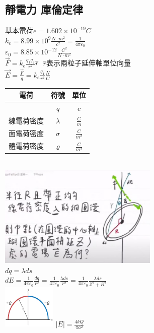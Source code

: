 \documentclass[a4paper,10pt,twocolumn,oneside]{article}
\begin{document}
\begin{normalsize}
\subsection{靜電力 庫倫定律}
$基本電荷 e=1.602\times10^{-19}C$ \\
$k_{e}=8.99\times 10^9 \frac{N\cdot m^2}{c^2}=\frac{1}{4 \pi \varepsilon_{0}}$ \\
$\varepsilon_{0}=8.85 \times 10^{-12} \frac{C^2}{N\cdot m^2}$ \\
$\vec{F}=k_{e}\frac{q_{1}q_{2}}{r^2}\hat{r}$  $ $
$ \hat{r}表示兩粒子延伸軸單位向量$ \\
$\vec{E}=\frac{\vec{F}}{q}=k_{e}\frac{q_{1}}{r^2}\frac{N}{C}$ \\
\begin{tabular}{|c|c|c|}
    \hline
    電荷&符號&單位 \\
    \hline
    & $q$ & $c$ \\
    \hline
    線電荷密度& $ \lambda $ & $ \frac{C}{m} $ \\
    \hline
    面電荷密度& $ \sigma $ & $ \frac{C}{m^2} $ \\
    \hline
    體電荷密度& $ \varrho $ & $ \frac{C}{m^3} $ \\
    \hline
\end{tabular} \\
\includegraphics[width=3in]{RingAndCharge.jpg}\\
$dq=\lambda ds$ \\
$dE=\frac{1}{4 \pi \varepsilon_{0}}\frac{dq}{r^2}=\frac{1}{4 \pi \varepsilon_{0}}\frac{\lambda ds}{r^2}=\frac{1}{4 \pi \varepsilon_{0}}\frac{\lambda ds}{Z^2 + R^2}$\\
\includegraphics[width=1in]{21-98.jpg} 
$ |E|=\frac{4kQ}{\pi a^2} $\\


\end{normalsize}
\end{document}
